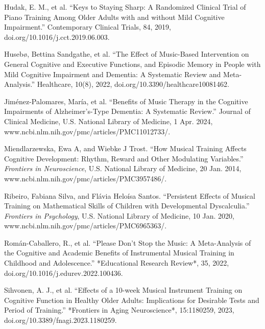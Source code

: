 \documentclass[11pt]{article}
\newcommand{\bibent}{\noindent\hangindent 20pt}
\begin{document}
\bibent
Hudak, E. M., et al. “Keys to Staying Sharp: A Randomized Clinical Trial of Piano Training Among Older Adults with and without Mild Cognitive Impairment.” Contemporary Clinical Trials, 84, 2019, doi.org/10.1016/j.cct.2019.06.003.
\vspace{10pt}

\bibent
Husebø, Bettina Sandgathe, et al. “The Effect of Music-Based Intervention on General Cognitive and Executive Functions, and Episodic Memory in People with Mild Cognitive Impairment and Dementia: A Systematic Review and Meta-Analysis.” Healthcare, 10(8), 2022, doi.org/10.3390/healthcare10081462.
\vspace{10pt}

\bibent 
Jiménez-Palomares, María, et al. “Benefits of Music Therapy in the Cognitive Impairments of Alzheimer’s-Type Dementia: A Systematic Review.” Journal of Clinical Medicine, U.S. National Library of Medicine, 1 Apr. 2024, www.ncbi.nlm.nih.gov/pmc/articles/PMC11012733/.
\vspace{10pt}

\bibent 
Miendlarzewska, Ewa A, and Wiebke J Trost. “How Musical Training Affects Cognitive Development: Rhythm, Reward and Other Modulating Variables.” \textit{Frontiers in Neuroscience}, U.S. National Library of Medicine, 20 Jan. 2014, www.ncbi.nlm.nih.gov/pmc/articles/PMC3957486/.
\vspace{10pt}

\bibent 
Ribeiro, Fabiana Silva, and Flávia Heloísa Santos. “Persistent Effects of Musical Training on Mathematical Skills of Children with Developmental Dyscalculia.” \textit{Frontiers in Psychology}, U.S. National Library of Medicine, 10 Jan. 2020, www.ncbi.nlm.nih.gov/pmc/articles/PMC6965363/.
\vspace{10pt}

\bibent 
Román-Caballero, R., et al. “Please Don’t Stop the Music: A Meta-Analysis of the Cognitive and Academic Benefits of Instrumental Musical Training in Childhood and Adolescence.” *Educational Research Review*, 35, 2022, doi.org/10.1016/j.edurev.2022.100436.
\vspace{10pt}

\bibent
Sihvonen, A. J., et al. “Effects of a 10-week Musical Instrument Training on Cognitive Function in Healthy Older Adults: Implications for Desirable Tests and Period of Training.” *Frontiers in Aging Neuroscience*, 15:1180259, 2023, doi.org/10.3389/fnagi.2023.1180259.
\vspace{10pt}
\end{document}
